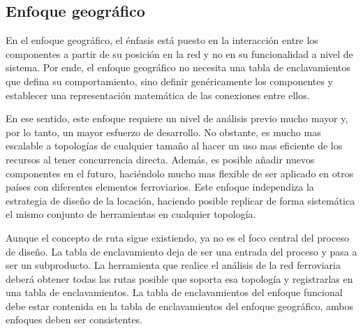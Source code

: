 \subsection{Enfoque geográfico}

    En el enfoque geográfico, el énfasis está puesto en la interacción entre los componentes a partir de su posición en la red y no en su funcionalidad a nivel de sistema. Por ende, el enfoque geográfico no necesita una tabla de enclavamientos que defina su comportamiento, sino definir genéricamente los componentes y establecer una representación matemática de las conexiones entre ellos. 
    
    En ese sentido, este enfoque requiere un nivel de análisis previo mucho mayor y, por lo tanto, un mayor esfuerzo de desarrollo. No obstante, es mucho mas escalable a topologías de cualquier tamaño al hacer un uso mas eficiente de los recursos al tener concurrencia directa. Además, es posible añadir nuevos componentes en el futuro, haciéndolo mucho mas flexible de ser aplicado en otros países con diferentes elementos ferroviarios. Este enfoque independiza la estrategia de diseño de la locación, haciendo posible replicar de forma sistemática el mismo conjunto de herramientas en cualquier topología.

    Aunque el concepto de ruta sigue existiendo, ya no es el foco central del proceso de diseño. La tabla de enclavamiento deja de ser una entrada del proceso y pasa a ser un subproducto. La herramienta que realice el análisis de la red ferroviaria deberá obtener todas las rutas posible que soporta esa topología y registrarlas en una tabla de enclavamientos. La tabla de enclavamientos del enfoque funcional debe estar contenida en la tabla de enclavamientos del enfoque geográfico, ambos enfoques deben ser consistentes.